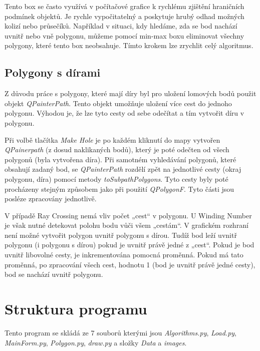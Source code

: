 \documentclass{article}
\begin{document}
\begin{spacing}{1.5}
Tento box se často využívá v počítačové grafice k rychlému zjištění hraničních podmínek objektů. Je rychle vypočitatelný a poskytuje hrubý odhad možných kolizí nebo průsečíků. Například v situaci, kdy hledáme, zda se bod nachází uvnitř nebo vně polygonu, můžeme pomocí min-max boxu eliminovat všechny polygony, které tento box neobsahuje. Tímto krokem lze zrychlit celý algoritmus.

\subsection{Polygony s dírami}
Z důvodu práce s polygony, které mají díry byl pro uložení lomových bodů použit objekt \textit{QPainterPath}. Tento objekt umožňuje uložení více cest do jednoho polygonu. Výhodou je, že lze tyto cesty od sebe odečítat a tím vytvořit díru v polygonu.

Při volbě tlačítka \textit{Make Hole} je po každém kliknutí do mapy vytvořen \textit{QPainerpath} (z dosud naklikaných bodů), který je poté odečten od všech polygonů (byla vytvořena díra). Při samotném vyhledávání polygonů, které obsahují zadaný bod, se \textit{QPainterPath} rozdělí zpět na jednotlivé cesty (okraj polygonu, díra) pomocí metody \textit{toSubpathPolygons}. Tyto cesty byly poté procházeny stejným způsobem jako při použití \textit{QPolygonF}. Tyto části jsou posléze zpracovány jednotlivě.

V případě Ray Crossing nemá vliv počet „cest“ v polygonu. U Winding Number je však nutné detekovat polohu bodu vůči všem „cestám“. V grafickém rozhraní není možné vytvořit polygon uvnitř polygonu s dírou. Tudíž bod leží uvnitř polygonu (i polygonu s dírou) pokud je uvnitř právě jedné z „cest“. Pokud je bod uvnitř libovolné cesty, je inkrementována pomocná proměnná. Pokud má tato proměnná, po zpracování všech cest, hodnotu 1 (bod je uvnitř právě jedné cesty), bod se nachází uvnitř polygonu.

\section{Struktura programu}
Tento program se skládá ze 7 souborů kterými jsou \textit{Algorithms.py}, \textit{Load.py}, \textit{MainForm.py}, \textit{Polygon.py}, \textit{draw.py} a složky \textit{Data} a \textit{images}. 


\end{spacing}
\end{document}
